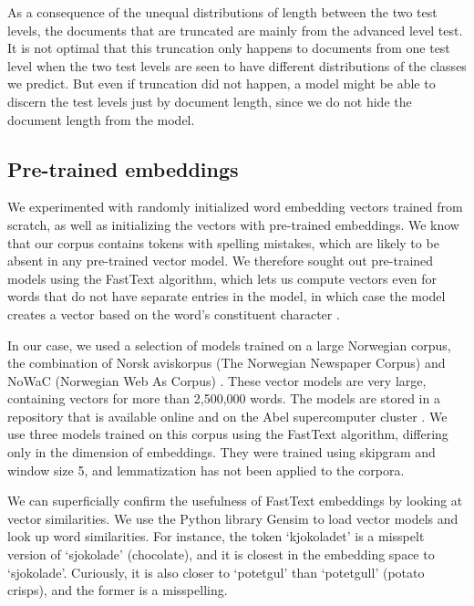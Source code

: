 As a consequence of the unequal distributions of length between the two test
levels, the documents that are truncated are mainly from the advanced level
test. It is not optimal that this truncation only happens to documents from
one test level when the two test levels are seen to have different
distributions of the classes we predict. But even if truncation did not
happen, a model might be able to discern the test levels just by document
length, since we do not hide the document length from the model.


\subsection{Pre-trained embeddings}
\label{subseq:fasttext}

We experimented with randomly initialized word embedding vectors trained from
scratch, as well as initializing the vectors with pre-trained embeddings. We
know that our corpus contains tokens with spelling mistakes, which are likely
to be absent in any pre-trained vector model. We therefore sought out
pre-trained models using the FastText algorithm, which lets us compute
vectors even for words that do not have separate entries in the model, in
which case the model creates a vector based on the word's constituent
character \ngrams.

In our case, we used a selection of models trained on a large Norwegian
corpus, the combination of Norsk aviskorpus (The Norwegian Newspaper Corpus)
and NoWaC (Norwegian Web As Corpus) \autocite{stadsnes2018}. These vector
models are very large, containing vectors for more than 2,500,000 words. The
models are stored in a repository that is available online and on the Abel
supercomputer cluster \autocite{murhaf2017repository}. We use three models
trained on this corpus using the FastText algorithm, differing only in the
dimension of embeddings. They were trained using skipgram and window size 5, 
and lemmatization has not been applied to the corpora.

We can superficially confirm the usefulness of FastText embeddings by looking
at vector similarities. We use the Python library Gensim \autocite{gensim} to
load vector models and look up word similarities. For instance, the token
`kjokoladet' is a misspelt version of `sjokolade' (chocolate), and it is
closest in the embedding space to `sjokolade'. Curiously, it is also closer
to `potetgul' than `potetgull' (potato crisps), and the former is a
misspelling.

